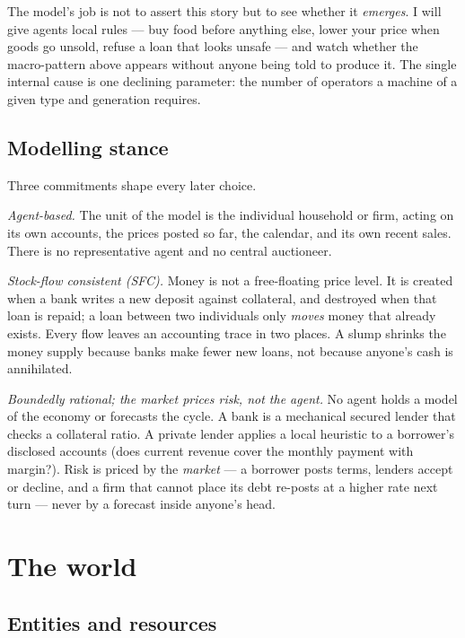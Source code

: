 \documentclass[11pt]{article}
\begin{document}
The model's job is not to assert this story but to see whether it
\emph{emerges}. I will give agents local rules --- buy food before anything
else, lower your price when goods go unsold, refuse a loan that looks unsafe
--- and watch whether the macro-pattern above appears without anyone being told
to produce it. The single internal cause is one declining parameter: the number
of operators a machine of a given type and generation requires.

\subsection{Modelling stance}

Three commitments shape every later choice.

\textit{Agent-based.} The unit of the model is the individual household or
firm, acting on its own accounts, the prices posted so far, the calendar, and
its own recent sales. There is no representative agent and no central
auctioneer.

\textit{Stock-flow consistent (SFC).} Money is not a free-floating price level.
It is created when a bank writes a new deposit against collateral, and
destroyed when that loan is repaid; a loan between two individuals only
\emph{moves} money that already exists. Every flow leaves an accounting trace
in two places. A slump shrinks the money supply because banks make fewer new
loans, not because anyone's cash is annihilated.

\textit{Boundedly rational; the market prices risk, not the agent.} No agent
holds a model of the economy or forecasts the cycle. A bank is a mechanical
secured lender that checks a collateral ratio. A private lender applies a local
heuristic to a borrower's disclosed accounts (does current revenue cover the
monthly payment with margin?). Risk is priced by the \emph{market} --- a
borrower posts terms, lenders accept or decline, and a firm that cannot place
its debt re-posts at a higher rate next turn --- never by a forecast inside
anyone's head.

\section{The world}

\subsection{Entities and resources}
\end{document}
